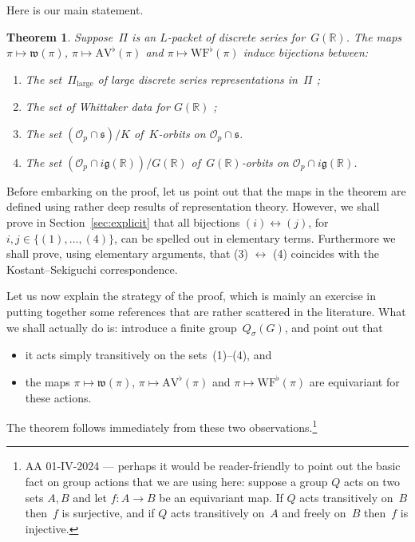 \documentclass[10pt,leqno]{article}
\newtheorem{theorem}[equation]{Theorem}
\renewcommand{\O}{\mathcal O}
\newcommand{\R}{\mathbb R}
\newcommand{\g}{\mathfrak g}
\newcommand{\s}{\mathfrak s}
\newcommand{\AV}{\mathrm{AV}}
\newcommand{\WF}{\mathrm{WF}}
\newcommand{\Op}{\O_p}
\begin{document}
Here is our main statement.

\begin{theorem} \label{th:main} Suppose~$\Pi$ is an $L$-packet of discrete series for~$G(\R)$. 
The maps $\pi \mapsto \mathfrak{w}(\pi)$, $\pi \mapsto \AV^\flat(\pi)$ and $\pi\mapsto \WF^\flat(\pi)$ induce bijections between:
\begin{enumerate}
\item[(1)] The set~$\Pi_{\mathrm{large}}$ of large discrete series representations in~$\Pi$ ;
\item[(2)] The set of Whittaker data for $G(\R)$ ;
\item[(3)] The set $(\Op \cap \s)/K$ of~$K$-orbits on $\mathcal{O}_p \cap \s$.
\item[(4)] The set $(\Op \cap i\g(\R))/G(\R)$ of~$G(\R)$-orbits on $\mathcal{O}_p \cap  i \g(\R)$.
\end{enumerate}
\end{theorem}

Before embarking on the proof, let us point out that the maps in the theorem are defined using rather deep results of representation theory. However, we shall prove in Section~\ref{sec:explicit} that all bijections $(i) \leftrightarrow (j)$, for $i,j \in \{(1), \dots, (4)\}$, can be spelled out in elementary terms. Furthermore we shall prove, using elementary arguments, that (3) $\leftrightarrow$ (4) coincides with the Kostant--Sekiguchi correspondence.  



Let us now explain the strategy of the proof, which is mainly an exercise in putting together some references that are rather scattered in the literature. What we shall actually do is: introduce a finite group~$Q_\sigma(G)$, and point out that 
\begin{itemize}
\item[(i)] it acts simply transitively on the sets~(1)--(4), and 
\item[(ii)] the maps $\pi \mapsto \mathfrak{w}(\pi)$, $\pi \mapsto \AV^\flat(\pi)$ and $\pi\mapsto \WF^\flat(\pi)$  are equivariant for these actions.
\end{itemize}
The theorem follows immediately from these two observations.\footnote{AA 01-IV-2024 --- perhaps it would be reader-friendly to point out the basic fact on group actions that we are using here: suppose a group $Q$ acts on two sets $A, B$ and let $f\colon A \to B$ be an equivariant map. If $Q$ acts transitively on~$B$  then~$f$ is surjective, and if $Q$ acts transitively on~$A$ and freely on~$B$ then~$f$ is injective.  }
\end{document}
